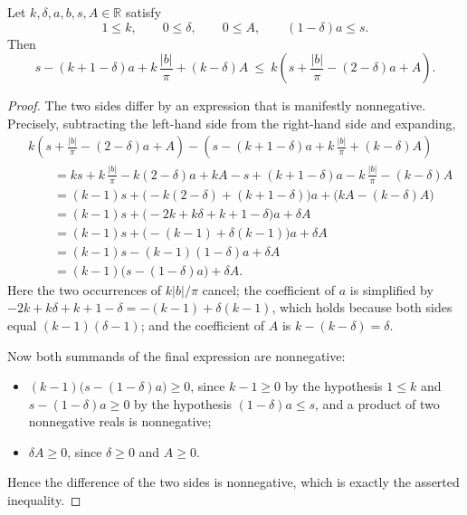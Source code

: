 \begin{lemma}[Absorbing the dimensional factor $k=n-2$]
Let $k,\delta,a,b,s,A\in\mathbb{R}$ satisfy
\[
  1\le k,\qquad 0\le\delta,\qquad 0\le A,\qquad (1-\delta)a\le s .
\]
Then
\[
  s-(k+1-\delta)a+k\,\frac{\lvert b\rvert}{\pi}+(k-\delta)A
  \ \le\ k\left(s+\frac{\lvert b\rvert}{\pi}-(2-\delta)a+A\right).
\]
\end{lemma}
\begin{proof}
The two sides differ by an expression that is manifestly nonnegative. Precisely,
subtracting the left-hand side from the right-hand side and expanding,
\begin{align*}
  &k\left(s+\frac{\lvert b\rvert}{\pi}-(2-\delta)a+A\right)
   -\left(s-(k+1-\delta)a+k\,\frac{\lvert b\rvert}{\pi}+(k-\delta)A\right)\\
  &\qquad=ks+k\,\frac{\lvert b\rvert}{\pi}-k(2-\delta)a+kA
    -s+(k+1-\delta)a-k\,\frac{\lvert b\rvert}{\pi}-(k-\delta)A\\
  &\qquad=(k-1)s+\bigl(-k(2-\delta)+(k+1-\delta)\bigr)a+\bigl(kA-(k-\delta)A\bigr)\\
  &\qquad=(k-1)s+\bigl(-2k+k\delta+k+1-\delta\bigr)a+\delta A\\
  &\qquad=(k-1)s+\bigl(-(k-1)+\delta(k-1)\bigr)a+\delta A\\
  &\qquad=(k-1)s-(k-1)(1-\delta)a+\delta A\\
  &\qquad=(k-1)\bigl(s-(1-\delta)a\bigr)+\delta A .
\end{align*}
Here the two occurrences of $k\lvert b\rvert/\pi$ cancel; the coefficient of $a$
is simplified by $-2k+k\delta+k+1-\delta=-(k-1)+\delta(k-1)$, which holds because
both sides equal $(k-1)(\delta-1)$; and the coefficient of $A$ is
$k-(k-\delta)=\delta$.

Now both summands of the final expression are nonnegative:
\begin{itemize}
\item $(k-1)\bigl(s-(1-\delta)a\bigr)\ge0$, since $k-1\ge0$ by the hypothesis
$1\le k$ and $s-(1-\delta)a\ge0$ by the hypothesis $(1-\delta)a\le s$, and a
product of two nonnegative reals is nonnegative;
\item $\delta A\ge0$, since $\delta\ge0$ and $A\ge0$.
\end{itemize}
Hence the difference of the two sides is nonnegative, which is exactly the
asserted inequality.
\end{proof}

